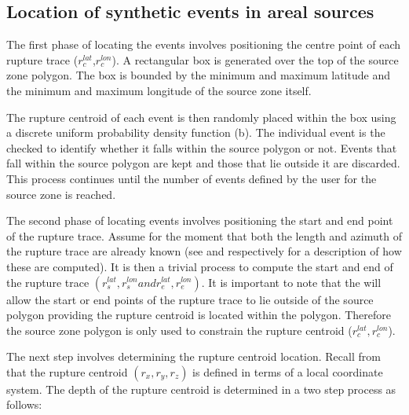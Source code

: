 \subsection{Location of synthetic events in areal sources}
\label{sec:areal_locn}

The first phase of locating the events involves positioning the
centre point of each rupture trace ($r_c^{lat}$,$r_c^{lon}$). A
rectangular box is generated over the top of the source zone polygon. The
box is bounded by the minimum and maximum latitude and the
minimum and maximum longitude of the source zone itself. 


The rupture centroid of each event is then randomly placed within the box 
using a discrete uniform probability density function
(b). The individual event is the checked to identify whether 
it falls within the source polygon or not. Events that fall within the source polygon 
are kept and those that lie outside it are discarded. This process continues until the number of events 
defined by the user for the source zone is reached.

The second phase of locating events involves positioning the start and end
point of the rupture trace. Assume for the moment that both the
length and azimuth of the rupture trace are already known (see
 and  respectively
for a description of how these are computed). It is then a trivial
process to compute the start and end of the rupture trace
$(r_s^{lat},r_s^{lon} and r_e^{lat},r_e^{lon})$. It is important to note that the  will allow the 
start or end points of the rupture trace to lie outside of the source polygon 
providing the rupture centroid is located within the polygon. Therefore the source zone polygon 
is only used to constrain the rupture centroid ($r_c^{lat},r_c^{lon}$).

The next step involves determining the rupture centroid location.
Recall from  that the rupture centroid
$(r_x,r_y,r_z)$ is defined in terms of a local coordinate system.
The depth of the rupture centroid is determined in a two step
process as follows:


